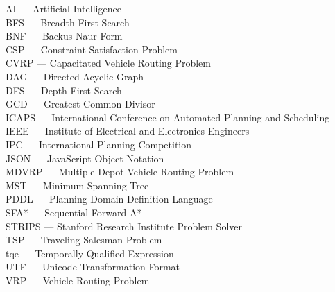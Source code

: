 
AI --- Artificial Intelligence\\
BFS --- Breadth-First Search\\
BNF --- Backus-Naur Form\\
CSP --- Constraint Satisfaction Problem\\
CVRP --- Capacitated Vehicle Routing Problem\\
DAG --- Directed Acyclic Graph\\
DFS --- Depth-First Search\\
GCD --- Greatest Common Divisor\\
ICAPS --- International Conference on Automated Planning and Scheduling\\
IEEE --- Institute of Electrical and Electronics Engineers\\
IPC --- International Planning Competition\\
JSON --- JavaScript Object Notation\\
MDVRP --- Multiple Depot Vehicle Routing Problem\\
MST --- Minimum Spanning Tree\\
PDDL --- Planning Domain Definition Language\\
SFA* --- Sequential Forward A*\\
STRIPS --- Stanford Research Institute Problem Solver\\
TSP --- Traveling Salesman Problem\\
tqe --- Temporally Qualified Expression\\
UTF --- Unicode Transformation Format\\
VRP --- Vehicle Routing Problem\\